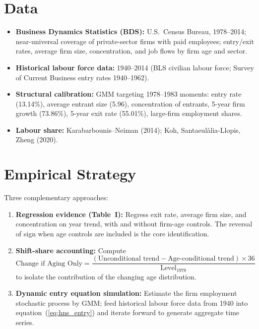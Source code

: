 \section{Data}

\begin{itemize}
  \item \textbf{Business Dynamics Statistics (BDS):} U.S.\ Census Bureau,
    1978--2014; near-universal coverage of private-sector firms with paid
    employees; entry/exit rates, average firm size, concentration, and
    job flows by firm age and sector.
  \item \textbf{Historical labour force data:} 1940--2014 (BLS civilian
    labour force; Survey of Current Business entry rates 1940--1962).
  \item \textbf{Structural calibration:} GMM targeting 1978--1983 moments:
    entry rate (13.14\%), average entrant size (5.96), concentration of
    entrants, 5-year firm growth (73.86\%), 5-year exit rate (55.01\%),
    large-firm employment shares.
  \item \textbf{Labour share:} Karabarbounis--Neiman (2014); Koh,
    Santaeul{\`a}lia-Llopis, Zheng (2020).
\end{itemize}

\section{Empirical Strategy}

Three complementary approaches:
\begin{enumerate}
  \item \textbf{Regression evidence (Table~I):} Regress exit rate, average
    firm size, and concentration on year trend, with and without firm-age
    controls. The reversal of sign when age controls are included is the
    core identification.
  \item \textbf{Shift-share accounting:} Compute
    \[
      \text{Change if Aging Only}
      = \frac{(\text{Unconditional trend} - \text{Age-conditional trend})\times 36}
             {\text{Level}_{1978}}
    \]
    to isolate the contribution of the changing age distribution.
  \item \textbf{Dynamic entry equation simulation:} Estimate the firm
    employment stochastic process by GMM; feed historical labour force
    data from 1940 into equation~(\ref{eq:hns_entry}) and iterate forward
    to generate aggregate time series.
\end{enumerate}


